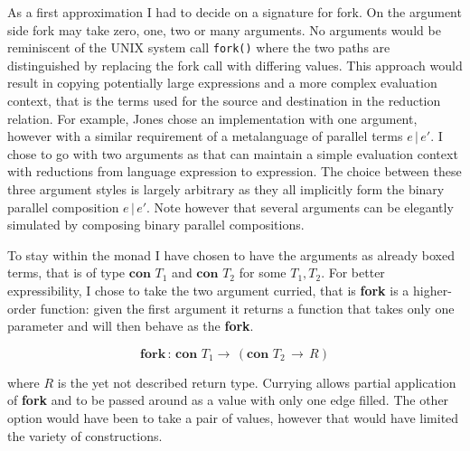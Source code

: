 \documentclass[12pt,twoside,notitlepage]{report}
\begin{document}
As a first approximation I had to decide on a signature for fork. On the argument side fork may take zero, one, two or many arguments. No arguments would be reminiscent of the UNIX system call \verb|fork()| where the two paths are distinguished by replacing the fork call with differing values. This approach would result in copying potentially large expressions and a more complex evaluation context, that is the terms used for the source and destination in the reduction relation. For example, Jones\cite{hoareetal2001tackling} chose an implementation with one argument, however with a similar requirement of a metalanguage of parallel terms $ e \, | \, e' $. I chose to go with two arguments as that can maintain a simple evaluation context with reductions from language expression to expression. The choice between these three argument styles is largely arbitrary as they all implicitly form the binary parallel composition $ e \, | \, e' $. Note however that several arguments can be elegantly simulated by composing binary parallel compositions.

To stay within the monad I have chosen to have the arguments as already boxed terms, that is of type $ \textbf{con } T_1 $ and $ \textbf{con } T_2 $ for some $ T_1, T_2 $. For better expressibility, I chose to take the two argument curried, that is \textbf{fork} is a higher-order function: given the first argument it returns a function that takes only one parameter and will then behave as the \textbf{fork}.

\[ \textbf{fork} \, : \, \textbf{con } T_1 \rightarrow \, (\textbf{con } T_2\, \rightarrow\, R ) \]  

where $ R $ is the yet not described return type. Currying allows partial application of \textbf{fork} and to be passed around as a value with only one edge filled. The other option would have been to take a pair of values, however that would have limited the variety of constructions.
\end{document}
